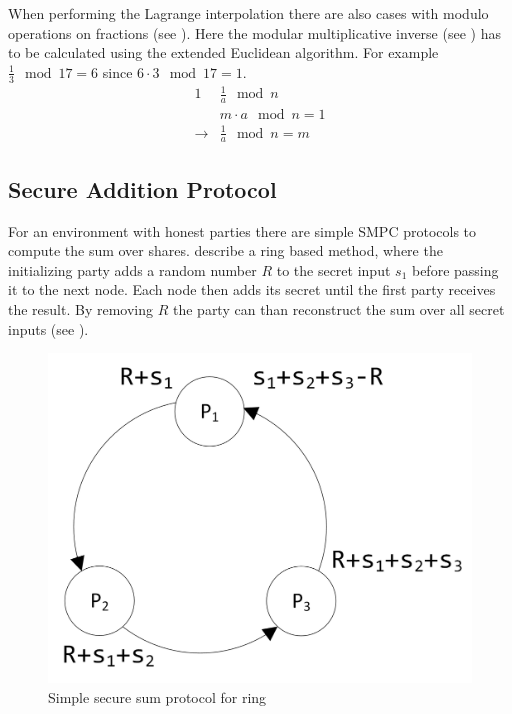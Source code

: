 When performing the Lagrange interpolation there are also cases with modulo operations on fractions (see ). Here the modular multiplicative inverse (see ) has to be calculated using the extended Euclidean algorithm. For example $\frac{1}{3}\mod 17=6$ since $6\cdot 3\mod 17=1$.
\begin{alignat}{1}
& \frac{1}{a}\mod n \label{eq:modular frac} \\
& m\cdot a\mod n=1 \label{eq:modular inverse} \\
 \rightarrow & \frac{1}{a}\mod n=m \label{eq:modular frac result}
\end{alignat}

\subsection{Secure Addition Protocol} \label{Secure Addition Protocol}

For an environment with honest parties there are simple \gls{SMPC} protocols to compute the sum over shares. \textcite{Clifton2002} describe a ring based method, where the initializing party adds a random number $R$ to the secret input $s_1$ before passing it to the next node. Each node then adds its secret until the first party receives the result. By removing $R$ the party can than reconstruct the sum over all secret inputs (see ).

\begin{figure}[!htb] %
	\caption{Simple secure sum protocol for ring} \label{figure:smpc sum ring}
	\includegraphics[scale=1.0]{figures/smpc-sum-simple-ring.png}
\end{figure}

